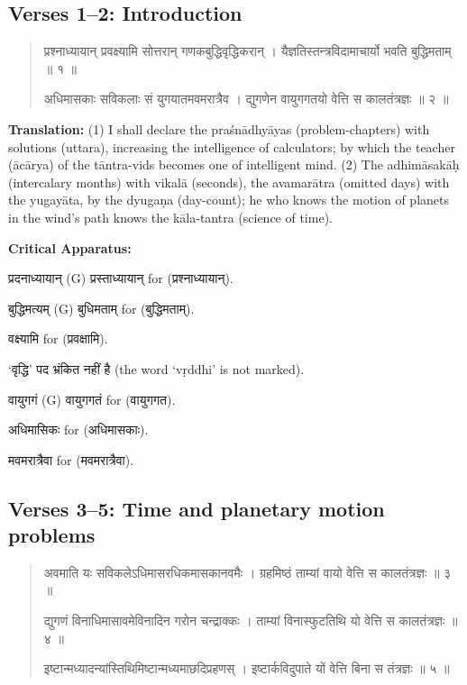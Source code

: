 \documentclass[11pt,a4paper]{article}
\newcommand{\dev}[1]{{\devanagarifont #1}}
\newenvironment{sanskritverse}{%
  \begin{quote}%
  \devanagarifont%
  \setlength{\leftmargin}{2em}%
}{\end{quote}}
\newenvironment{variants}{%
  \small%
  \color{varecolor}%
  \list{}{\leftmargin=2em\itemindent=-1em}%
}{\endlist}
\begin{document}
\subsection*{Verses 1--2: Introduction}

\begin{sanskritverse}
\dev{प्रश्नाध्यायान् प्रवक्ष्यामि सोत्तरान् गणकबुद्धिवृद्धिकरान्} ।
\dev{यैज्ञतिस्तन्त्रविदामाचार्यो भवति बुद्धिमताम् ॥ १ ॥}

\dev{अधिमासकाः सविकलाः सं युगयातमवमरात्रैव} ।
\dev{द्युगणेन वायुगगतयो वेत्ति स कालतंत्रज्ञः ॥ २ ॥}
\end{sanskritverse}

\textbf{Translation:} (1) I shall declare the praśnādhyāyas (problem-chapters) with 
solutions (uttara), increasing the intelligence of calculators; by which the 
teacher (ācārya) of the tāntra-vids becomes one of intelligent mind. (2) The 
adhimāsakāḥ (intercalary months) with vikalā (seconds), the avamarātra (omitted 
days) with the yugayāta, by the dyugaṇa (day-count); he who knows the motion of 
planets in the wind's path knows the kāla-tantra (science of time).

\textcolor{varecolor}{\textbf{Critical Apparatus:}}
\begin{variants}
\item[1.1] \dev{प्रदनाध्यायान्} (G) \dev{प्रस्ताध्यायान्} \dev{for} (\dev{प्रश्नाध्यायान्}).
\item[1.2] \dev{बुद्धिमत्यम्} (G) \dev{बुधिमताम्} \dev{for} (\dev{बुद्धिमताम्}).
\item[1.3] \dev{वक्ष्यामि} \dev{for} (\dev{प्रवक्षामि}).
\item[1.4] \dev{`वृद्धि' पद भ्रंकित नहीं है} (the word `vṛddhi' is not marked).
\item[2.1] \dev{वायुगगं} (G) \dev{वायुगगतं} \dev{for} (\dev{वायुगगत}).
\item[2.2] \dev{अधिमासिकः} \dev{for} (\dev{अधिमासकाः}).
\item[2.3] \dev{मवमरात्रैवा} \dev{for} (\dev{मवमरात्रैवा}).
\end{variants}

\subsection*{Verses 3--5: Time and planetary motion problems}

\begin{sanskritverse}
\dev{अवमाति यः सविकलेऽधिमासरधिकमासकानवमैः} ।
\dev{ग्रहमिष्ठं ताम्यां वायो वेत्ति स कालतंत्रज्ञः ॥ ३ ॥}

\dev{द्युगणं विनाधिमासावमेविनादिन गरोन चन्द्राक्कः} ।
\dev{ताम्यां विनास्फुटतिथि यो वेत्ति स कालतंत्रज्ञः ॥ ४ ॥}

\dev{इष्टान्मध्यादन्यांस्तिथिमिष्टान्मध्यमाछदिप्रहणस्} ।
\dev{इष्टार्कविदुपाते यों वेत्ति बिना स तंत्रज्ञः ॥ ५ ॥}
\end{sanskritverse}
\end{document}
